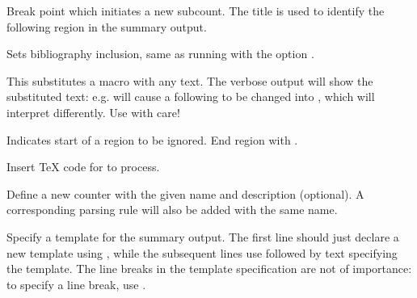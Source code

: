 
\begin{description}

Break point which initiates a new subcount. The title is used to identify the following region in the summary output.

Sets bibliography inclusion, same as running \TeXcount{} with the option .

This substitutes a macro with any text. The verbose output will show the substituted text: e.g.  will cause a following  to be changed into , which \TeXcount{} will interpret differently. Use with care!

\option[ignore]
Indicates start of a region to be ignored. End region with .

Insert \TeX{} code for \TeXcount{} to process.

Define a new counter with the given name and description (optional). A corresponding parsing rule will also be added with the same name.

Specify a template for the summary output. The first line should just declare a new template using , while the subsequent lines use  followed by text specifying the template. The line breaks in the template specification are not of importance: to specify a line break, use .

\end{description}


